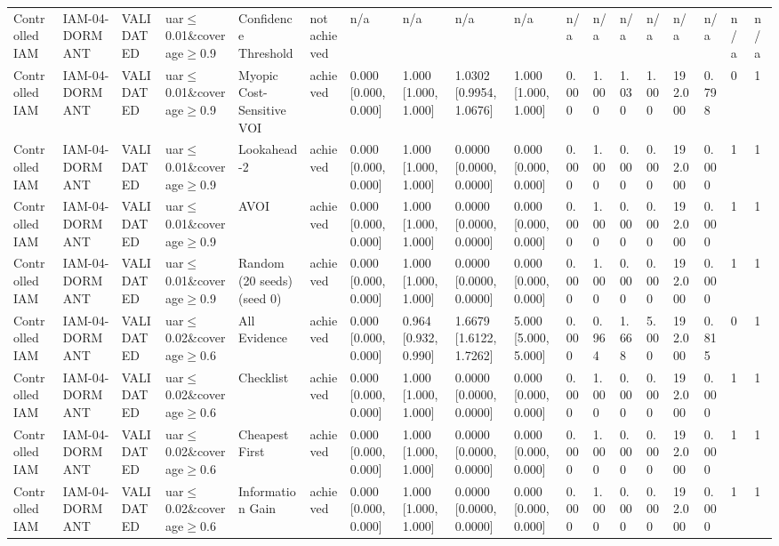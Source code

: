\begin{table}[!ht]
{\begin{tabular}{llllllllllllllllll}
Controlled IAM & IAM-04-DORMANT & VALIDATED & uar$\le$0.01\&coverage$\ge$0.9 & Confidence Threshold & not achieved & n/a & n/a & n/a & n/a & n/a & n/a & n/a & n/a & n/a & n/a & n/a & n/a \\
Controlled IAM & IAM-04-DORMANT & VALIDATED & uar$\le$0.01\&coverage$\ge$0.9 & Myopic Cost-Sensitive VOI & achieved & 0.000 [0.000, 0.000] & 1.000 [1.000, 1.000] & 1.0302 [0.9954, 1.0676] & 1.000 [1.000, 1.000] & 0.000 & 1.000 & 1.030 & 1.000 & 192.000 & 0.798 & 0 & 1 \\
Controlled IAM & IAM-04-DORMANT & VALIDATED & uar$\le$0.01\&coverage$\ge$0.9 & Lookahead-2 & achieved & 0.000 [0.000, 0.000] & 1.000 [1.000, 1.000] & 0.0000 [0.0000, 0.0000] & 0.000 [0.000, 0.000] & 0.000 & 1.000 & 0.000 & 0.000 & 192.000 & 0.000 & 1 & 1 \\
Controlled IAM & IAM-04-DORMANT & VALIDATED & uar$\le$0.01\&coverage$\ge$0.9 & AVOI & achieved & 0.000 [0.000, 0.000] & 1.000 [1.000, 1.000] & 0.0000 [0.0000, 0.0000] & 0.000 [0.000, 0.000] & 0.000 & 1.000 & 0.000 & 0.000 & 192.000 & 0.000 & 1 & 1 \\
Controlled IAM & IAM-04-DORMANT & VALIDATED & uar$\le$0.01\&coverage$\ge$0.9 & Random (20 seeds) (seed 0) & achieved & 0.000 [0.000, 0.000] & 1.000 [1.000, 1.000] & 0.0000 [0.0000, 0.0000] & 0.000 [0.000, 0.000] & 0.000 & 1.000 & 0.000 & 0.000 & 192.000 & 0.000 & 1 & 1 \\
Controlled IAM & IAM-04-DORMANT & VALIDATED & uar$\le$0.02\&coverage$\ge$0.6 & All Evidence & achieved & 0.000 [0.000, 0.000] & 0.964 [0.932, 0.990] & 1.6679 [1.6122, 1.7262] & 5.000 [5.000, 5.000] & 0.000 & 0.964 & 1.668 & 5.000 & 192.000 & 0.815 & 0 & 1 \\
Controlled IAM & IAM-04-DORMANT & VALIDATED & uar$\le$0.02\&coverage$\ge$0.6 & Checklist & achieved & 0.000 [0.000, 0.000] & 1.000 [1.000, 1.000] & 0.0000 [0.0000, 0.0000] & 0.000 [0.000, 0.000] & 0.000 & 1.000 & 0.000 & 0.000 & 192.000 & 0.000 & 1 & 1 \\
Controlled IAM & IAM-04-DORMANT & VALIDATED & uar$\le$0.02\&coverage$\ge$0.6 & Cheapest First & achieved & 0.000 [0.000, 0.000] & 1.000 [1.000, 1.000] & 0.0000 [0.0000, 0.0000] & 0.000 [0.000, 0.000] & 0.000 & 1.000 & 0.000 & 0.000 & 192.000 & 0.000 & 1 & 1 \\
Controlled IAM & IAM-04-DORMANT & VALIDATED & uar$\le$0.02\&coverage$\ge$0.6 & Information Gain & achieved & 0.000 [0.000, 0.000] & 1.000 [1.000, 1.000] & 0.0000 [0.0000, 0.0000] & 0.000 [0.000, 0.000] & 0.000 & 1.000 & 0.000 & 0.000 & 192.000 & 0.000 & 1 & 1 \\

\end{tabular}}
\end{table}
